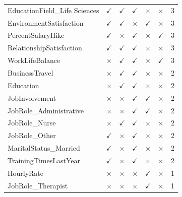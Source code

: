 \documentclass[a4paper,fleqn]{cas-sc}
\begin{document}
\begin{table}[pos=h]
\begin{tabular}{@{}lcccccc@{}}
        EducationField\_Life Sciences & $\checkmark$ & $\checkmark$ & $\checkmark$ & $\times$ & $\times$ & 3 \\
        EnvironmentSatisfaction & $\checkmark$ & $\checkmark$ & $\times$ & $\checkmark$ & $\times$ & 3 \\
        PercentSalaryHike & $\checkmark$ & $\times$ & $\checkmark$ & $\times$ & $\checkmark$ & 3 \\
        RelationshipSatisfaction & $\checkmark$ & $\checkmark$ & $\checkmark$ & $\times$ & $\times$ & 3 \\
        WorkLifeBalance & $\times$ & $\checkmark$ & $\checkmark$ & $\times$ & $\checkmark$ & 3 \\
        BusinessTravel & $\times$ & $\checkmark$ & $\checkmark$ & $\times$ & $\times$ & 2 \\
        Education & $\times$ & $\checkmark$ & $\checkmark$ & $\times$ & $\times$ & 2 \\
        JobInvolvement & $\times$ & $\times$ & $\checkmark$ & $\checkmark$ & $\times$ & 2 \\
        JobRole\_Administrative & $\times$ & $\times$ & $\checkmark$ & $\checkmark$ & $\times$ & 2 \\
        JobRole\_Nurse & $\times$ & $\checkmark$ & $\checkmark$ & $\times$ & $\times$ & 2 \\
        JobRole\_Other & $\checkmark$ & $\times$ & $\checkmark$ & $\times$ & $\times$ & 2 \\
        MaritalStatus\_Married & $\checkmark$ & $\times$ & $\checkmark$ & $\times$ & $\times$ & 2 \\
        TrainingTimesLastYear & $\checkmark$ & $\times$ & $\checkmark$ & $\times$ & $\times$ & 2 \\
        HourlyRate & $\times$ & $\times$ & $\times$ & $\checkmark$ & $\times$ & 1 \\
        JobRole\_Therapist & $\times$ & $\times$ & $\times$ & $\checkmark$ & $\times$ & 1 \\
        \bottomrule
    \end{tabular}
\end{table}
\end{document}
